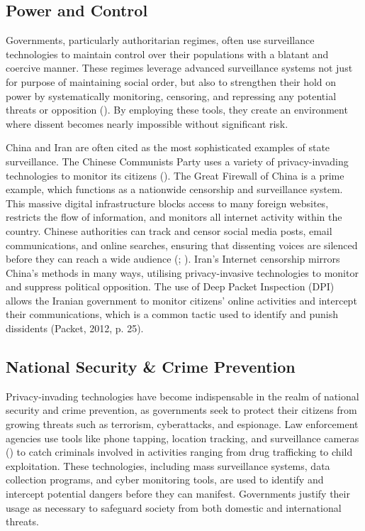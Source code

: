 \documentclass[a4paper,12pt]{article}
\begin{document}
\subsection{Power and Control}
Governments, particularly authoritarian regimes, often use surveillance technologies to maintain control over their populations with a blatant and coercive manner. These regimes leverage advanced surveillance systems not just for purpose of maintaining social order, but also to strengthen their hold on power by systematically monitoring, censoring, and repressing any potential threats or opposition (\cite{dragu2021digital}). By employing these tools, they create an environment where dissent becomes nearly impossible without significant risk.

China and Iran are often cited as the most sophisticated examples of state surveillance. The Chinese Communists Party uses a variety of privacy-invading technologies to monitor its citizens (\cite{hicks2022export}). The Great Firewall of China is a prime example, which functions as a nationwide censorship and surveillance system. This massive digital infrastructure blocks access to many foreign websites, restricts the flow of information, and monitors all internet activity within the country. Chinese authorities can track and censor social media posts, email communications, and online searches, ensuring that dissenting voices are silenced before they can reach a wide audience (\cite{romaniuk2018china}; \cite{packet2012privacy}). Iran’s Internet censorship mirrors China’s methods in many ways, utilising privacy-invasive technologies to monitor and suppress political opposition. The use of Deep Packet Inspection (DPI) allows the Iranian government to monitor citizens' online activities and intercept their communications, which is a common tactic used to identify and punish dissidents (Packet, 2012, p. 25).

\subsection{National Security \& Crime Prevention}
Privacy-invading technologies have become indispensable in the realm of national security and crime prevention, as governments seek to protect their citizens from growing threats such as terrorism, cyberattacks, and espionage. Law enforcement agencies use tools like phone tapping, location tracking, and surveillance cameras (\cite{horan2021cyber}) to catch criminals involved in activities ranging from drug trafficking to child exploitation. These technologies, including mass surveillance systems, data collection programs, and cyber monitoring tools, are used to identify and intercept potential dangers before they can manifest. Governments justify their usage as necessary to safeguard society from both domestic and international threats.
\end{document}
